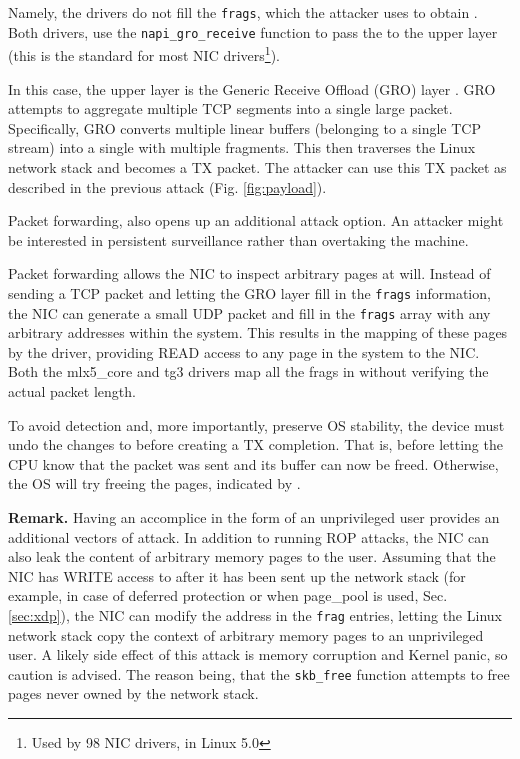 Namely, the drivers do not fill the \texttt{frags}, which the attacker uses to obtain \means{}. Both drivers, use the \texttt{napi\_gro\_receive} function to pass the \skb{} to the upper layer (this is the standard for most NIC drivers\footnote{Used by 98 NIC drivers, in Linux 5.0}). 

In this case, the upper layer is the Generic Receive Offload (GRO) layer \cite{gro}. GRO attempts to aggregate multiple TCP segments into a single large packet. Specifically, GRO converts multiple linear \skb{} buffers (belonging to a single TCP stream) into a single \skb{} with multiple fragments. This \skb{} then traverses the Linux network stack and becomes a TX packet. The attacker can use this TX packet as described in the previous attack (Fig. \ref{fig:payload}).

Packet forwarding, also opens up an additional attack option. An attacker might be interested in persistent surveillance rather than overtaking the machine. 

Packet forwarding allows the NIC to inspect arbitrary pages at will. 
Instead of sending a TCP packet and letting the GRO layer fill in the \texttt{frags} information, the NIC can generate a small UDP packet and fill in the \texttt{frags} array with any arbitrary \page{} addresses within the system. This results in the mapping of these pages by the driver, providing READ access to any page in the system to the NIC. Both the mlx5\_core and tg3 drivers map all the frags in \shinfo{} without verifying the actual packet length.

To avoid detection and, more importantly, preserve OS stability, the device must undo the changes to \shinfo{} before creating a TX completion. That is, before letting the CPU know that the packet was sent and its buffer can now be freed. Otherwise, the OS will try freeing the pages, indicated by \shinfo.

\smallskip
\noindent\textbf{Remark.} Having an accomplice in the form of an unprivileged user provides an additional vectors of attack. In addition to running ROP attacks, the NIC can also leak the content of arbitrary memory pages to the user. Assuming that the NIC has WRITE access to \shinfo{} after it has been sent up the network stack (for example, in case of deferred protection or when page\_pool is used, Sec. \ref{sec:xdp}), the NIC can modify the \page{} address in the \texttt{frag} entries, letting the Linux network stack copy the context of arbitrary memory pages to an unprivileged user. A likely side effect of this attack is memory corruption and Kernel panic, so caution is advised. The reason being, that the \texttt{skb\_free} function attempts to free pages never owned by the network stack.
